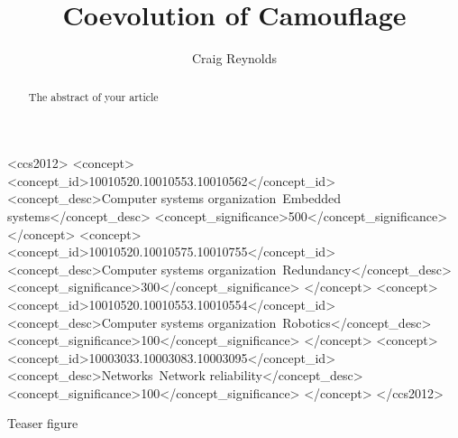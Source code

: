 \documentclass[sigconf,anonymous,review]{acmart}
\begin{document}
\title{Coevolution of Camouflage}


\author{Craig Reynolds}

\renewcommand{\shortauthors}{Firstauthor et al.}

\begin{abstract}
  The abstract of your article
\end{abstract}

\begin{CCSXML}
<ccs2012>
 <concept>
  <concept_id>10010520.10010553.10010562</concept_id>
  <concept_desc>Computer systems organization~Embedded systems</concept_desc>
  <concept_significance>500</concept_significance>
 </concept>
 <concept>
  <concept_id>10010520.10010575.10010755</concept_id>
  <concept_desc>Computer systems organization~Redundancy</concept_desc>
  <concept_significance>300</concept_significance>
 </concept>
 <concept>
  <concept_id>10010520.10010553.10010554</concept_id>
  <concept_desc>Computer systems organization~Robotics</concept_desc>
  <concept_significance>100</concept_significance>
 </concept>
 <concept>
  <concept_id>10003033.10003083.10003095</concept_id>
  <concept_desc>Networks~Network reliability</concept_desc>
  <concept_significance>100</concept_significance>
 </concept>
</ccs2012>
\end{CCSXML}



\begin{teaserfigure}
  \caption{Teaser figure}
  \label{fig:teaser}
\end{teaserfigure}

\maketitle
\end{document}

